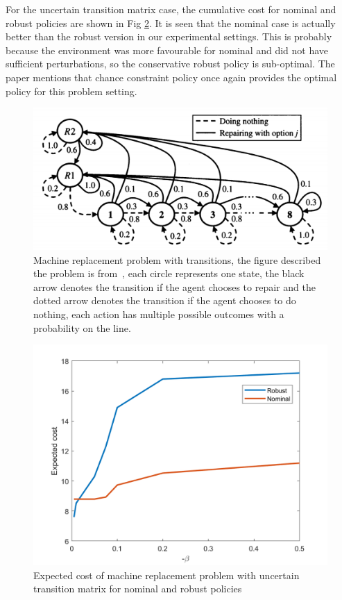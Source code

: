 \documentclass[11pt,reqno]{amsart}
\theoremstyle{definition}
\numberwithin{equation}{section}
\theoremstyle{remark}
\begin{document}
\medskip

For the uncertain transition matrix case, the cumulative cost for nominal and robust policies are shown in Fig \ref{machine_transition_plot}. It is seen that the nominal case is actually better than the robust version in our experimental settings. This is probably because the environment was more favourable for nominal and did not have sufficient perturbations, so the conservative robust policy is sub-optimal. The paper \cite{delage2010percentile} mentions that chance constraint policy once again provides the optimal policy for this problem setting.

\begin{figure}
\centering
    \includegraphics[width=0.7\linewidth]{images/mrp_trans.png}

\caption{Machine replacement problem with transitions, the figure described the problem is from~\cite{delage2010percentile}, each circle represents one state, the black arrow denotes the transition if the agent chooses to repair and the dotted arrow denotes the transition if the agent chooses to do nothing, each action has multiple possible outcomes with a probability on the line.}
\label{machine_reward_map}
\end{figure}


\begin{figure}
    \centering
    \includegraphics[width=0.4\linewidth]{machine_transition_plot.png}
\caption{Expected cost of machine replacement problem with uncertain transition matrix for nominal and robust policies}
\label{machine_transition_plot}
\end{figure}
\end{document}

